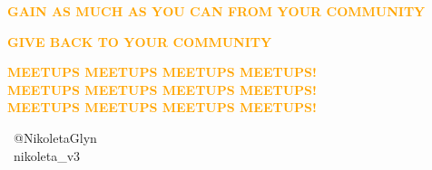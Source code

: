 \documentclass{beamer}
\begin{document}
\begin{frame}
    \begin{center}
        \textbf{\textcolor{orange}{GAIN AS MUCH AS YOU CAN FROM YOUR COMMUNITY}}
    \end{center}
\end{frame}

\begin{frame}
    \begin{center}
        \textbf{\textcolor{orange}{GIVE BACK TO YOUR COMMUNITY}}
    \end{center}
\end{frame}

\begin{frame}
    \begin{center}
        \textbf{\textcolor{orange}{MEETUPS MEETUPS MEETUPS MEETUPS!}} \\
        \textbf{\textcolor{orange}{MEETUPS MEETUPS MEETUPS MEETUPS!}} \\
        \textbf{\textcolor{orange}{MEETUPS MEETUPS MEETUPS MEETUPS!}} \\
    \end{center}
\end{frame}

\begin{frame}
    \begin{center}
    \faTwitter \ @NikoletaGlyn \\
    \faInstagram \ nikoleta\_v3
    \end{center}
\end{frame}
\end{document}
